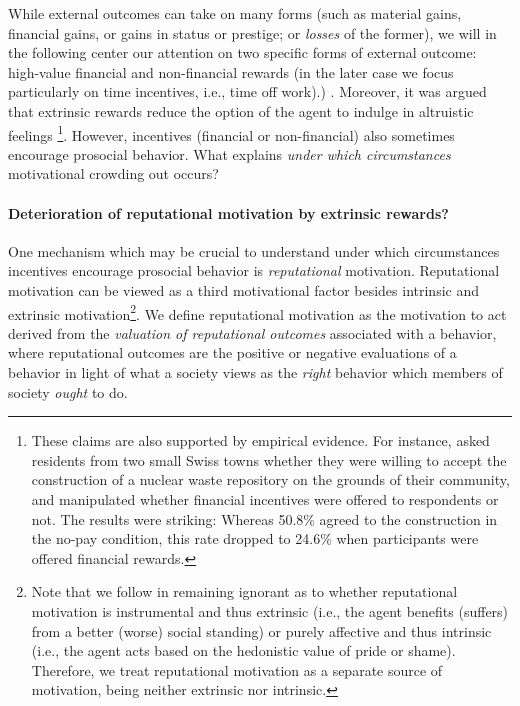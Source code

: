 \documentclass[AER]{AEA}
\begin{document}
{While external outcomes can take on many forms (such as material gains, financial gains, or gains in status or prestige; or \textit{losses} of the former), we will in the following center our attention on two specific forms of external outcome: high-value financial and non-financial rewards (in the later case we focus particularly on time incentives, i.e., time off work).}) \citep{deci_effects_1971, frey_motivation_2001, gneezy_pay_2000, gneezy_fine_2000, mellstrom_crowding_2008}. Moreover, it was argued that extrinsic rewards reduce the option of the agent to indulge in altruistic feelings \citep{frey_cost_1997, frey_motivation_2001}\footnote{These claims are also supported by empirical evidence. For instance, \cite{frey_cost_1997} asked residents from two small Swiss towns whether they were willing to accept the construction of a nuclear waste repository on the grounds of their community, and manipulated whether financial incentives were offered to respondents or not. The results were striking: Whereas 50.8\% agreed to the construction in the no-pay condition, this rate dropped to 24.6\% when participants were offered financial rewards.}. However, incentives (financial or non-financial) also sometimes encourage prosocial behavior. What explains \textit{under which circumstances} motivational crowding out occurs?

\paragraph{Deterioration of reputational motivation by extrinsic rewards?}

One mechanism which may be crucial to understand under which circumstances incentives encourage prosocial behavior is \textit{reputational} motivation. Reputational motivation \cite[also termed image motivation;][]{ariely_doing_2009} can be viewed as a third motivational factor besides intrinsic and extrinsic motivation\footnote{Note that we follow \cite{benabou_incentives_2006} in remaining ignorant as to whether reputational motivation is instrumental and thus extrinsic (i.e., the agent benefits (suffers) from a better (worse) social standing) or purely affective and thus intrinsic (i.e., the agent acts based on the hedonistic value of pride or shame). Therefore, we treat reputational motivation as a separate source of motivation, being neither extrinsic nor intrinsic.}. We define reputational motivation as the motivation to act derived from the \textit{valuation of reputational outcomes} associated with a behavior, where reputational outcomes are the positive or negative evaluations of a behavior in light of what a society views as the \textit{right} behavior which members of society \textit{ought} to do. 
\end{document}
